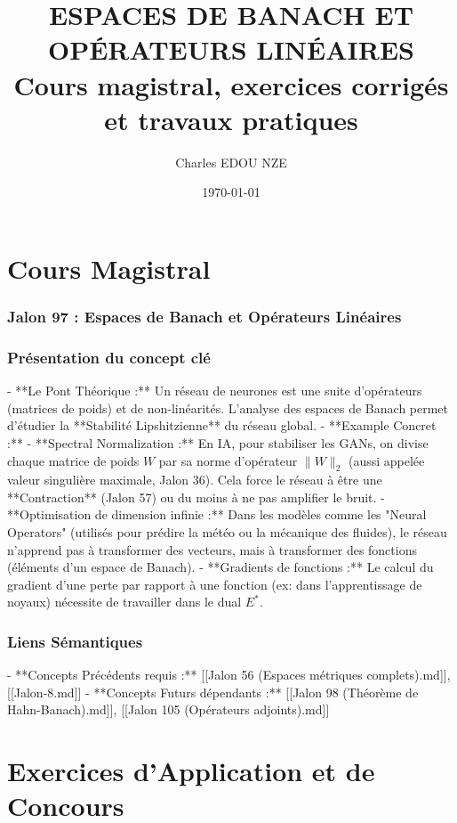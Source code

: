 \documentclass[11pt,a4paper]{article}
\title{\Huge ESPACES DE BANACH ET OPÉRATEURS LINÉAIRES \\ \large Cours magistral, exercices corrigés et travaux pratiques}
\author{\Large Charles EDOU NZE}
\date{\today}
\begin{document}
\maketitle
\tableofcontents
\newpage

\part{Cours Magistral}


\section{Jalon 97 : Espaces de Banach et Opérateurs Linéaires}

\section{Présentation du concept clé}

- **Le Pont Théorique :** Un réseau de neurones est une suite d'opérateurs (matrices de poids) et de non-linéarités. L'analyse des espaces de Banach permet d'étudier la **Stabilité Lipshitzienne** du réseau global.
- **Example Concret :**
    - **Spectral Normalization :** En IA, pour stabiliser les GANs, on divise chaque matrice de poids $W$ par sa norme d'opérateur $\|W\|_2$ (aussi appelée valeur singulière maximale, Jalon 36). Cela force le réseau à être une **Contraction** (Jalon 57) ou du moins à ne pas amplifier le bruit.
    - **Optimisation de dimension infinie :** Dans les modèles comme les "Neural Operators" (utilisés pour prédire la météo ou la mécanique des fluides), le réseau n'apprend pas à transformer des vecteurs, mais à transformer des fonctions (éléments d'un espace de Banach).
    - **Gradients de fonctions :** Le calcul du gradient d'une perte par rapport à une fonction (ex: dans l'apprentissage de noyaux) nécessite de travailler dans le dual $E^*$.

\section{Liens Sémantiques}

- **Concepts Précédents requis :** [[Jalon 56 (Espaces métriques complets).md]], [[Jalon-8.md]]
- **Concepts Futurs dépendants :** [[Jalon 98 (Théorème de Hahn-Banach).md]], [[Jalon 105 (Opérateurs adjoints).md]]


\newpage
\part{Exercices d'Application et de Concours}
\end{document}
